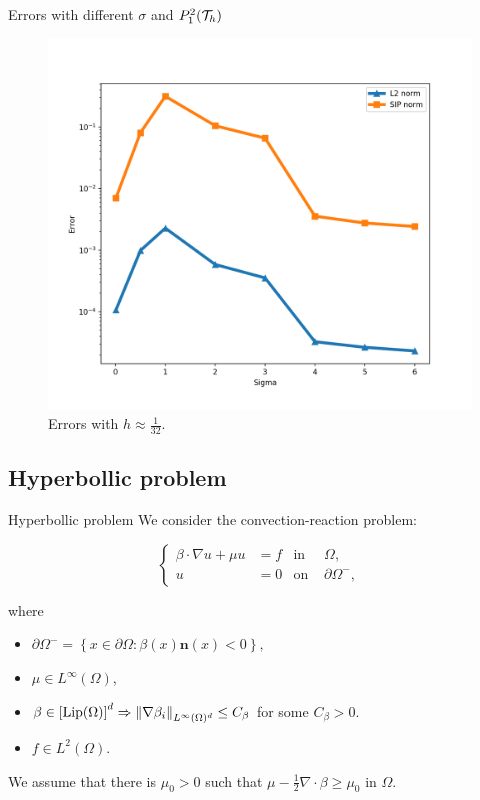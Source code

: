 		\begin{frame}{Errors with different $\sigma$ and $\relax{P}_1^2(\mathcal{T}_h)$}
			\begin{figure}[h!]
				\centering
				\includegraphics[scale=0.37]{img/Difusion/errores_difusion_sigma.png}
				\caption{Errors with $h\approx\frac{1}{32}$.}
			\end{figure}
		\end{frame}

	\subsection{Hyperbollic problem}
	
	\begin{frame}{Hyperbollic problem}
		We consider the convection-reaction problem:
		\begin{block}{}
		\begin{equation*}
		\left\{
		\begin{aligned}
		\beta\cdot\nabla u+\mu u&=f & \text{in } &\Omega, \\
		u&=0 & \text{on } &\partial\Omega^-,
		\end{aligned}
		\right.
		\end{equation*}
		\end{block}
		where 
		\begin{itemize}
			\item $\partial\Omega^-=\left\{x\in\partial\Omega\colon \beta(x)\mathbf{n}(x)<0\right\},$
			\item $\mu\in L^\infty(\Omega)$,
			\item $\beta\in\left[\text{Lip}(\Omega)\right]^d \Rightarrow \left\|\nabla\beta_i\right\|_{L^\infty(\Omega)^d}\le C_\beta$ for some $C_\beta >0$.
			\item $f\in L^2(\Omega)$.
		\end{itemize}
		\vspace*{.5cm}
		We assume that there is $\mu_0>0$ such that $\displaystyle\mu-\frac{1}{2}\nabla\cdot\beta\geq\mu_0$ in $\Omega$.
		
		\end{frame}

